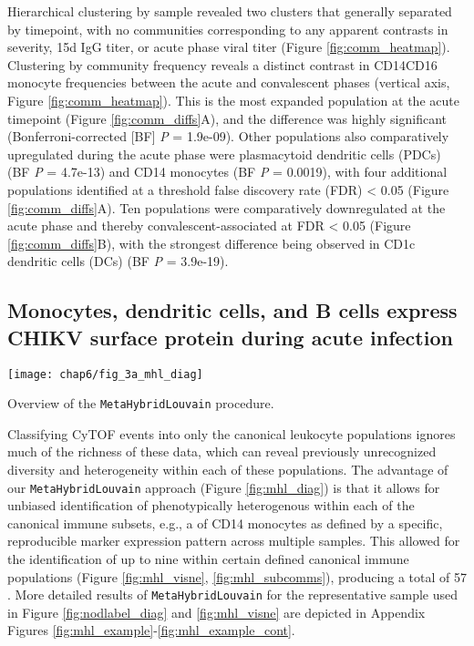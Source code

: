 Hierarchical clustering by sample revealed two clusters that generally separated by timepoint, with no communities corresponding to any apparent contrasts in severity, 15d IgG titer, or acute phase viral titer (Figure \ref{fig:comm_heatmap}). Clustering by community frequency reveals a distinct contrast in CD14\sups{+}\allowbreak CD16\sups{+} monocyte frequencies between the acute and convalescent phases (vertical axis, Figure \ref{fig:comm_heatmap}). This is the most expanded population at the acute timepoint (Figure \ref{fig:comm_diffs}A), and the difference was highly significant (Bonferroni-corrected [BF] \emph{P} = 1.9e-09). Other populations also comparatively upregulated during the acute phase were plasmacytoid dendritic cells (PDCs) (BF \emph{P} = 4.7e-13) and CD14\sups{+} monocytes (BF \emph{P} = 0.0019), with four additional populations identified at a threshold false discovery rate (FDR) < 0.05 (Figure \ref{fig:comm_diffs}A). Ten populations were comparatively downregulated at the acute phase and thereby convalescent-associated at FDR < 0.05 (Figure \ref{fig:comm_diffs}B), with the strongest difference being observed in CD1c dendritic cells (DCs) (BF \emph{P} = 3.9e-19).

\subsection{Monocytes, dendritic cells, and B cells express CHIKV surface protein during acute infection}

\begin{marginfigure}
  \centering
  \texttt{[image: chap6/fig\_3a\_mhl\_diag]}
  \vspace{1em}
  \caption[Overview of the \texttt{MetaHybridLouvain} procedure]{Overview of the \texttt{MetaHybridLouvain} procedure.}
  \label{fig:mhl_diag}
\end{marginfigure}

Classifying CyTOF events into only the canonical leukocyte populations ignores much of the richness of these data, which can reveal previously unrecognized diversity and heterogeneity within each of these populations. The advantage of our \texttt{MetaHybridLouvain} approach (Figure \ref{fig:mhl_diag}) is that it allows for unbiased identification of phenotypically heterogenous \subcommunities{} within each of the canonical immune subsets,\autocite{Samusik2016} e.g., a \subcommunity{} of CD14\sups{+} monocytes as defined by a specific, reproducible marker expression pattern across multiple samples. This allowed for the identification of up to nine \subcommunities{} within certain defined canonical immune populations (Figure \ref{fig:mhl_visne}, \ref{fig:mhl_subcomms}), producing a total of 57 \subcommunities{}. More detailed results of \texttt{MetaHybridLouvain} for the representative sample used in Figure \ref{fig:nodlabel_diag} and \ref{fig:mhl_visne} are depicted in Appendix Figures \ref{fig:mhl_example}-\ref{fig:mhl_example_cont}.

